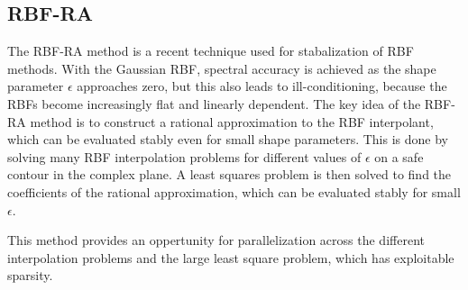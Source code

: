 \documentclass{article}
\begin{document}
\subsection*{RBF-RA}
The RBF-RA method is a recent technique used for stabalization of RBF methods.
With the Gaussian RBF, spectral accuracy is achieved as the shape parameter $\epsilon$ approaches zero, but this also leads to ill-conditioning, because the RBFs become increasingly flat and linearly dependent.
The key idea of the RBF-RA method is to construct a rational approximation to the RBF interpolant, which can be evaluated stably even for small shape parameters.
This is done by solving many RBF interpolation problems for different values of $\epsilon$ on a safe contour in the complex plane.
A least squares problem is then solved to find the coefficients of the rational approximation, which can be evaluated stably for small $\epsilon$.

This method provides an oppertunity for parallelization across the different interpolation problems and the large least square problem, which has exploitable sparsity.
\end{document}
